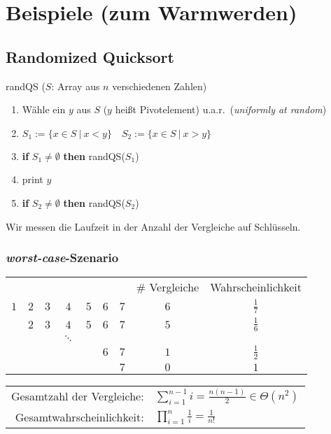 \section{Beispiele (\glqq zum Warmwerden\grqq)}
\subsection{Randomized Quicksort}
\begin{algorithm}
	\caption{randQS ($S$: Array aus $n$ verschiedenen Zahlen)}
	\vspace{0.4cm}
	\begin{enumerate}
		\setlength{\itemsep}{2pt}
		\setlength{\parskip}{2pt}
		\setlength{\parsep}{2pt}
		\item Wähle ein $y$ aus $S$ ($y$ heißt Pivotelement) u.a.r.\ (\textit{uniformly at random})
		\item $S_1 := \{ x \in S\ |\ x < y \} \quad S_2 := \{ x \in S\ |\ x > y \}$
		\item \textbf{if} $S_1 \not= \emptyset$ \textbf{then} randQS($S_1$)
		\item print $y$
		\item \textbf{if} $S_2 \not= \emptyset$ \textbf{then} randQS($S_2$)
	\end{enumerate}
\end{algorithm}
Wir messen die Laufzeit in der Anzahl der Vergleiche auf Schlüsseln.
\subsubsection{\textit{worst-case}-Szenario}
\begin{center}
\renewcommand\arraystretch{1.3}
\begin{tabular}{ccccccc|c|c}
	&&&&&&& \# Vergleiche & Wahrscheinlichkeit \\
	$1$&$2$&$3$&$4$&$5$&$6$&$7$&$6$&$\frac{1}{7}$\\
	&$2$&$3$&$4$&$5$&$6$&$7$&$5$&$\frac{1}{6}$\\
	&&&$\ddots$&&&&&\\
	&&&&&$6$&$7$&$1$&$\frac{1}{2}$\\
	&&&&&&$7$&$0$&$1$
\end{tabular}
\renewcommand\arraystretch{2.5}
\begin{tabular}{rl}
	Gesamtzahl der Vergleiche: & $\displaystyle \sum_{i=1}^{n-1} i = \frac{n(n-1)}{2} \in \Theta(n^2)$ \\
	Gesamtwahrscheinlichkeit: & $\displaystyle \prod_{i=1}^{n} \frac{1}{i} = \frac{1}{n!}$
\end{tabular}
\end{center}
